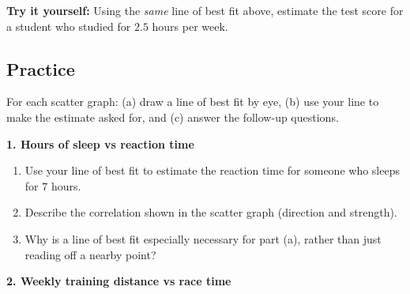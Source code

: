 \documentclass[11pt]{article}
\newcommand{\ans}{\hrulefill}
\newcommand{\anshere}{\par\vspace{0.8em}\noindent\ans\par\vspace{1.1em}}
\newcommand{\scatteraxis}[8]{%
  \begin{axis}[
    width=8.0cm, height=5.6cm,
    xmin=#1, xmax=#2, ymin=#3, ymax=#4,
    xtick distance=#5, ytick distance=#6,
    grid=both, grid style={line width=.1pt, draw=gray!35},
    axis lines=left,
    xlabel={#7}, ylabel={#8},
    tick label style={font=\tiny},
    label style={font=\small},
  ]
}
\begin{document}
\vspace{0.6em}
\noindent\textbf{Try it yourself:} Using the \emph{same} line of best fit above, estimate the test
score for a student who studied for $2.5$ hours per week.
\anshere

\newpage

\subsection*{Practice}
\noindent For each scatter graph: (a) draw a line of best fit by eye, (b) use your line to make
the estimate asked for, and (c) answer the follow-up questions.

\renewcommand{\anshere}{\par\vspace{0.2em}\noindent\ans\par\vspace{0.2em}}

\vspace{0.3em}
\noindent\textbf{1. Hours of sleep vs reaction time}

\begin{center}
\end{center}

\begin{enumerate}[label=(\alph*)]
  \item Use your line of best fit to estimate the reaction time for someone who sleeps for
    $7$ hours.
  \anshere
  \item Describe the correlation shown in the scatter graph (direction and strength).
  \anshere
  \item Why is a line of best fit especially necessary for part (a), rather than just reading
    off a nearby point?
  \anshere
\end{enumerate}

\vspace{0.4em}
\noindent\textbf{2. Weekly training distance vs race time}

\begin{center}
\end{center}
\end{document}
